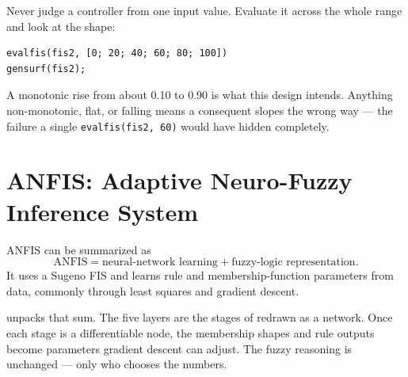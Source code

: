 \begin{tryit}
Never judge a controller from one input value. Evaluate it across the whole range and look at the shape:

\begin{lstlisting}[style=mlmatlab]
evalfis(fis2, [0; 20; 40; 60; 80; 100])
gensurf(fis2);
\end{lstlisting}

A monotonic rise from about 0.10 to 0.90 is what this design intends. Anything non-monotonic, flat, or falling means a consequent slopes the wrong way --- the failure a single \texttt{evalfis(fis2, 60)} would have hidden completely.
\end{tryit}

\section{ANFIS: Adaptive Neuro-Fuzzy Inference System}

ANFIS can be summarized as
\[
\text{ANFIS}=\text{neural-network learning}+\text{fuzzy-logic representation}.
\]
It uses a Sugeno FIS and learns rule and membership-function parameters from data, commonly through least squares and gradient descent.

 unpacks that sum. The five layers are the stages of
 redrawn as a network. Once each stage is a differentiable node, the
membership shapes and rule outputs become parameters gradient descent can adjust. The fuzzy
reasoning is unchanged --- only who chooses the numbers.

